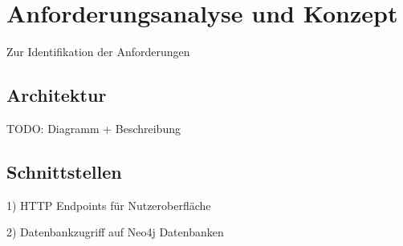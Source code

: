\section{Anforderungsanalyse und Konzept}

Zur Identifikation der Anforderungen

\subsection{Architektur}

TODO: Diagramm + Beschreibung

\subsection{Schnittstellen}

1) HTTP Endpoints für Nutzeroberfläche

2) Datenbankzugriff auf Neo4j Datenbanken
